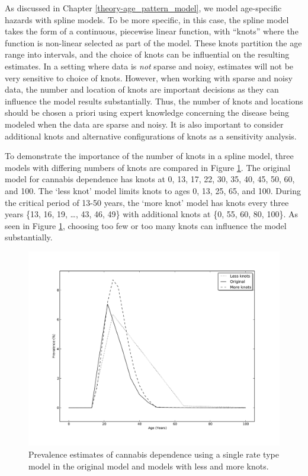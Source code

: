 As discussed in Chapter \ref{theory-age_pattern_model}, we model
age-specific hazards with spline models.  To be more specific, in this
case, the spline model takes the form of a continuous, piecewise
linear function, with ``knots'' where the function is non-linear
selected as part of the model.  These knots partition the age range
into intervals, and the choice of knots can be influential on the
resulting estimates.  In a setting where data is \emph{not} sparse and
noisy, estimates will not be very sensitive to choice of knots.
However, when working with sparse and noisy data, the number and
location of knots are important decisions as they can influence the
model results substantially.  Thus, the number of knots and locations
should be chosen a priori using expert knowledge concerning the
disease being modeled when the data are sparse and noisy.  It is also
important to consider additional knots and alternative configurations
of knots as a sensitivity analysis.

To demonstrate the importance of the number of knots in a spline
model, three models with differing numbers of knots are compared in
Figure \ref{fig:app-cannabis_knots}.  The original model for cannabis
dependence has knots at 0, 13, 17, 22, 30, 35, 40, 45, 50, 60, and
100.  The `less knot' model limits knots to ages 0, 13, 25, 65, and
100.  During the critical period of 13-50 years, the `more knot' model
has knots every three years \{13, 16, 19, \ldots, 43, 46, 49\} with
additional knots at \{0, 55, 60, 80, 100\}.  As seen in Figure
\ref{fig:app-cannabis_knots}, choosing too few or too many knots can
influence the model substantially.

    \begin{figure}[h]
        \begin{center}
            \includegraphics[width=\textwidth]{applications/cannabis_dependence-knots.pdf}
            \caption{Prevalence estimates of cannabis dependence using
              a single rate type model in the original model and
              models with less and more knots. }
        \label{fig:app-cannabis_knots}
        \end{center}
    \end{figure}

